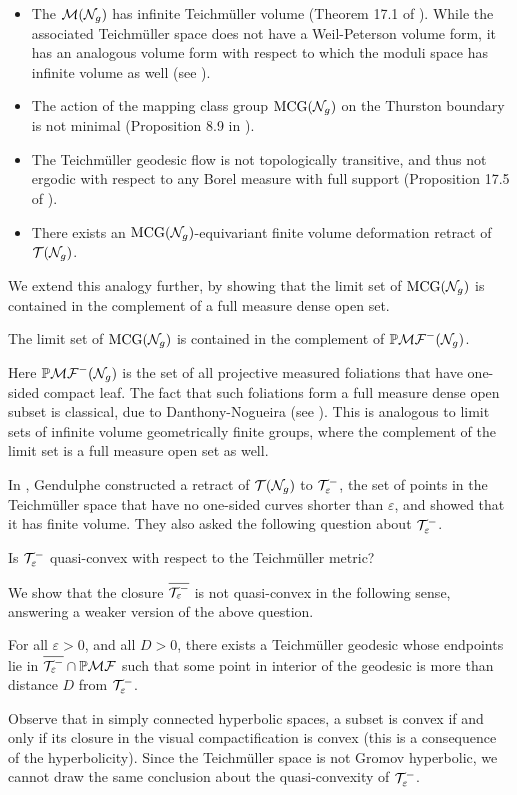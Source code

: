 \documentclass[12pt, reqno]{amsart}
\begin{document}
\begin{itemize}
\item The $\mathcal{M}(\mathcal{N}_g)$ has infinite Teichm\"uller volume (Theorem 17.1 of \cite{gendulphe_whats_2017}).
  While the associated Teichm\"uller space does not have a Weil-Peterson volume form, it has an analogous volume form with respect to which the moduli space has infinite volume as well (see \cite{norbury2008lengths}).
\item The action of the mapping class group $\mathrm{MCG}(\mathcal{N}_g)$ on the Thurston boundary is not minimal (Proposition 8.9 in \cite{gendulphe_whats_2017}).
\item The Teichm\"uller geodesic flow is not topologically transitive, and thus not ergodic with respect to any Borel measure with full support (Proposition 17.5 of \cite{gendulphe_whats_2017}).
\item There exists an $\mathrm{MCG}(\mathcal{N}_g)$-equivariant finite volume deformation retract of $\mathcal{T}(\mathcal{N}_g)$.
\end{itemize}

We extend this analogy further, by showing that the limit set of $\mathrm{MCG}(\mathcal{N}_g)$ is contained in the complement of a full measure dense open set.
\begingroup
\def\thetheorem{\ref{cor:geolimset}}
\begin{theorem}
  The limit set of $\mathrm{MCG}(\mathcal{N}_g)$ is contained in the complement of $\mathbb{P}\mathcal{MF}^-(\mathcal{N}_g)$.
\end{theorem}
\addtocounter{theorem}{-1}
\endgroup
Here $\mathbb{P}\mathcal{MF}^-(\mathcal{N}_g)$ is the set of all projective measured foliations that have one-sided compact leaf.
The fact that such foliations form a full measure dense open subset is classical, due to Danthony-Nogueira (see \cite{ASENS_1990_4_23_3_469_0}).
This is analogous to limit sets of infinite volume geometrically finite groups, where the complement of the limit set is a full measure open set as well.

In \cite{gendulphe_whats_2017}, Gendulphe constructed a retract of $\mathcal{T}(\mathcal{N}_g)$ to $\mathcal{T}_{\varepsilon}^{-}$, the set of points in the Teichm\"uller space that have no one-sided curves shorter than $\varepsilon$, and showed that it has finite volume.
They also asked the following question about $\mathcal{T}_{\varepsilon}^{-}$.
\begin{unquestion}
  Is $\mathcal{T}_{\varepsilon}^{-}$ quasi-convex with respect to the Teichmüller metric?
\end{unquestion}
We show that the closure $\overline{\mathcal{T}_{\varepsilon}^{-}}$ is not quasi-convex in the following sense, answering a weaker version of the above question.
\begingroup
\def\thetheorem{\ref{thm:qc-fail}}
\begin{theorem}
  For all $\varepsilon > 0$, and all $D > 0$, there exists a Teichm\"uller geodesic whose endpoints lie in $\overline{\mathcal{T}_{\varepsilon}^{-}} \cap \mathbb{P}\mathcal{MF}$ such that some point in interior of the geodesic is more than distance $D$ from $\mathcal{T}_{\varepsilon}^{-}$.
\end{theorem}
\addtocounter{theorem}{-1}
\endgroup
Observe that in simply connected hyperbolic spaces, a subset is convex if and only if its closure in the visual compactification is convex (this is a consequence of the hyperbolicity).
Since the Teichm\"uller space is not Gromov hyperbolic, we cannot draw the same conclusion about the quasi-convexity of $\mathcal{T}_{\varepsilon}^{-}$.
\end{document}
